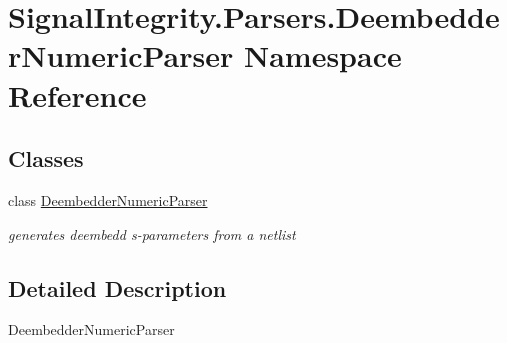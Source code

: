 \hypertarget{namespaceSignalIntegrity_1_1Parsers_1_1DeembedderNumericParser}{}\section{Signal\+Integrity.\+Parsers.\+Deembedder\+Numeric\+Parser Namespace Reference}
\label{namespaceSignalIntegrity_1_1Parsers_1_1DeembedderNumericParser}
\subsection*{Classes}
\begin{DoxyCompactItemize}
\item 
class \hyperlink{classSignalIntegrity_1_1Parsers_1_1DeembedderNumericParser_1_1DeembedderNumericParser}{Deembedder\+Numeric\+Parser}
\begin{DoxyCompactList}\small\item\em generates deembedd s-\/parameters from a netlist \end{DoxyCompactList}\end{DoxyCompactItemize}


\subsection{Detailed Description}
\begin{DoxyVerb}DeembedderNumericParser\end{DoxyVerb}
 